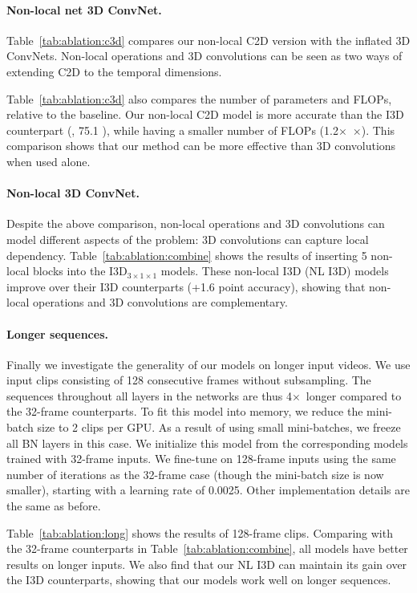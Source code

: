 \documentclass[10pt,twocolumn,letterpaper]{article}
\def\x{$\times$}
\begin{document}
\paragraph{Non-local net \vs 3D ConvNet.} Table~\ref{tab:ablation:c3d} compares our non-local C2D version with the inflated 3D ConvNets. Non-local operations and 3D convolutions can be seen as two ways of extending C2D to the temporal dimensions.

Table~\ref{tab:ablation:c3d} also compares the number of parameters and FLOPs, relative to the baseline. Our non-local C2D model is more accurate than the I3D counterpart (\eg, 75.1 ), while having a smaller number of FLOPs (1.2\x~\x). This comparison shows that our method can be more effective than 3D convolutions when used alone.

\paragraph{Non-local 3D ConvNet.} Despite the above comparison, non-local operations and 3D convolutions can model different aspects of the problem: 3D convolutions can capture local dependency.  Table~\ref{tab:ablation:combine} shows the results of inserting 5 non-local blocks into the I3D$_{3\times1\times1}$ models. These non-local I3D (NL I3D) models improve over their I3D counterparts (+1.6 point accuracy), showing that non-local operations and 3D convolutions are complementary.

\paragraph{Longer sequences.} Finally we investigate the generality of our models on longer input videos. We use input clips consisting of 128 consecutive frames without subsampling.
The sequences throughout all layers in the networks are thus 4\x~longer compared to the 32-frame counterparts. To fit this model into memory, we reduce the mini-batch size to 2 clips per GPU. As a result of using small mini-batches, we freeze all BN layers in this case. We initialize this model from the corresponding models trained with 32-frame inputs. We fine-tune on 128-frame inputs using the same number of iterations as the 32-frame case (though the mini-batch size is now smaller), starting with a learning rate of 0.0025. Other implementation details are the same as before.

Table~\ref{tab:ablation:long} shows the results of 128-frame clips. Comparing with the 32-frame counterparts in Table~\ref{tab:ablation:combine}, all models have better results on longer inputs. We also find that our NL I3D can maintain its gain over the I3D counterparts, showing that our models work well on longer sequences.
\end{document}
